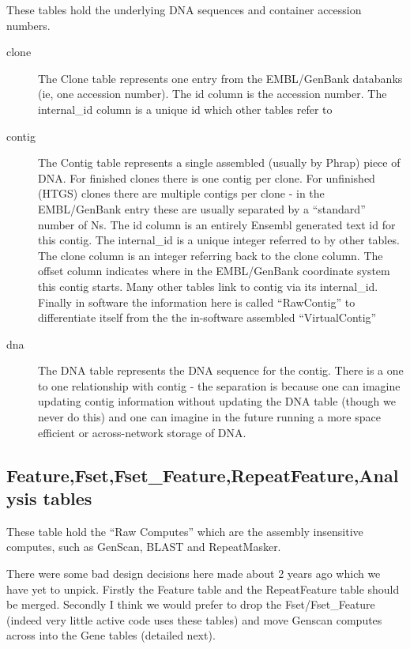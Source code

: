 \documentclass[11pt,a4paper]{article}
\begin{document}
These tables hold the underlying DNA sequences and container accession numbers.

\begin{description}
\item[clone] The Clone table represents one entry from the
EMBL/GenBank databanks (ie, one accession number). The id column is
the accession number. The internal\_id column is a unique id which 
other tables refer to
\item[contig] The Contig table represents a single assembled (usually by
Phrap) piece of DNA. For finished clones there is one contig per clone. For
unfinished (HTGS) clones there are multiple contigs per clone - in the EMBL/GenBank
entry these are usually separated by a ``standard'' number of Ns. The id column
is an entirely Ensembl generated text id for this contig. The internal\_id is a
unique integer referred to by other tables. The clone column is an integer referring
back to the clone column. The offset column indicates where in the EMBL/GenBank
coordinate system this contig starts. Many other tables link to contig via its
internal\_id. Finally in software the information here is called ``RawContig'' to 
differentiate itself from the the in-software assembled ``VirtualContig''
\item[dna] The DNA table represents the DNA sequence for the contig. There is a
one to one relationship with contig - the separation is because one can imagine updating
contig information without updating the DNA table (though we never do this) and 
one can imagine in the future running a more space efficient or across-network storage
of DNA.
\end{description}

\subsection{Feature,Fset,Fset\_Feature,RepeatFeature,Analysis tables}

These table hold the ``Raw Computes'' which are the assembly insensitive computes,
such as GenScan, BLAST and RepeatMasker. 

There were some bad design decisions here made about 2 years ago which
we have yet to unpick. Firstly the Feature table and the RepeatFeature
table should be merged.  Secondly I think we would prefer to drop the
Fset/Fset\_Feature (indeed very little active code uses these tables)
and move Genscan computes across into the Gene tables (detailed next).
\end{document}
